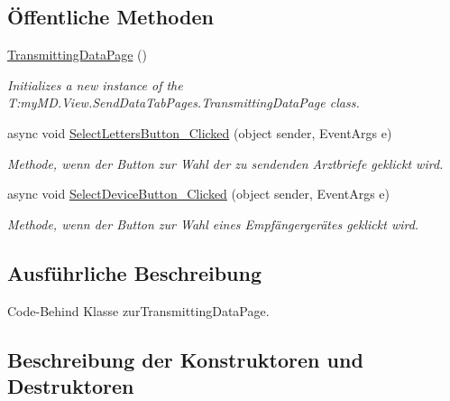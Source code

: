 \subsection*{Öffentliche Methoden}
\begin{DoxyCompactItemize}
\item 
\mbox{\hyperlink{classmy_m_d_1_1_view_1_1_send_data_tab_pages_1_1_transmitting_data_page_ac1fa89a1f86e8f1b72e0a07ab569a525}{Transmitting\+Data\+Page}} ()
\begin{DoxyCompactList}\small\item\em Initializes a new instance of the T\+:my\+M\+D.\+View.\+Send\+Data\+Tab\+Pages.\+Transmitting\+Data\+Page class. \end{DoxyCompactList}\item 
async void \mbox{\hyperlink{classmy_m_d_1_1_view_1_1_send_data_tab_pages_1_1_transmitting_data_page_abe7d80460f8b561dfecadfd4fbdd849f}{Select\+Letters\+Button\+\_\+\+Clicked}} (object sender, Event\+Args e)
\begin{DoxyCompactList}\small\item\em Methode, wenn der Button zur Wahl der zu sendenden Arztbriefe geklickt wird. \end{DoxyCompactList}\item 
async void \mbox{\hyperlink{classmy_m_d_1_1_view_1_1_send_data_tab_pages_1_1_transmitting_data_page_a5412e851cb3b9c6f53c66edbae50292d}{Select\+Device\+Button\+\_\+\+Clicked}} (object sender, Event\+Args e)
\begin{DoxyCompactList}\small\item\em Methode, wenn der Button zur Wahl eines Empfängergerätes geklickt wird. \end{DoxyCompactList}\end{DoxyCompactItemize}


\subsection{Ausführliche Beschreibung}
Code-\/\+Behind Klasse zur\+Transmitting\+Data\+Page. 



\subsection{Beschreibung der Konstruktoren und Destruktoren}
\mbox{\label{classmy_m_d_1_1_view_1_1_send_data_tab_pages_1_1_transmitting_data_page_ac1fa89a1f86e8f1b72e0a07ab569a525}} 
